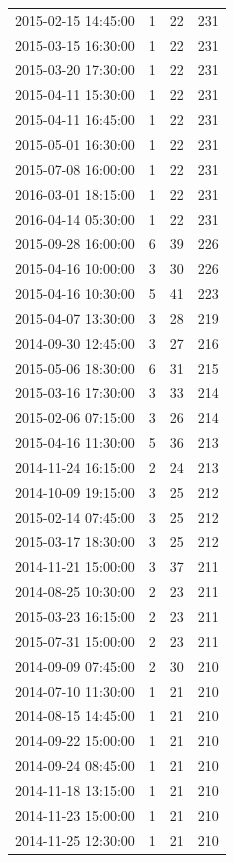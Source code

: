 \begin{tabular}{lrrr}
2015-02-15 14:45:00 & 1 & 22 & 231 \\
2015-03-15 16:30:00 & 1 & 22 & 231 \\
2015-03-20 17:30:00 & 1 & 22 & 231 \\
2015-04-11 15:30:00 & 1 & 22 & 231 \\
2015-04-11 16:45:00 & 1 & 22 & 231 \\
2015-05-01 16:30:00 & 1 & 22 & 231 \\
2015-07-08 16:00:00 & 1 & 22 & 231 \\
2016-03-01 18:15:00 & 1 & 22 & 231 \\
2016-04-14 05:30:00 & 1 & 22 & 231 \\
2015-09-28 16:00:00 & 6 & 39 & 226 \\
2015-04-16 10:00:00 & 3 & 30 & 226 \\
2015-04-16 10:30:00 & 5 & 41 & 223 \\
2015-04-07 13:30:00 & 3 & 28 & 219 \\
2014-09-30 12:45:00 & 3 & 27 & 216 \\
2015-05-06 18:30:00 & 6 & 31 & 215 \\
2015-03-16 17:30:00 & 3 & 33 & 214 \\
2015-02-06 07:15:00 & 3 & 26 & 214 \\
2015-04-16 11:30:00 & 5 & 36 & 213 \\
2014-11-24 16:15:00 & 2 & 24 & 213 \\
2014-10-09 19:15:00 & 3 & 25 & 212 \\
2015-02-14 07:45:00 & 3 & 25 & 212 \\
2015-03-17 18:30:00 & 3 & 25 & 212 \\
2014-11-21 15:00:00 & 3 & 37 & 211 \\
2014-08-25 10:30:00 & 2 & 23 & 211 \\
2015-03-23 16:15:00 & 2 & 23 & 211 \\
2015-07-31 15:00:00 & 2 & 23 & 211 \\
2014-09-09 07:45:00 & 2 & 30 & 210 \\
2014-07-10 11:30:00 & 1 & 21 & 210 \\
2014-08-15 14:45:00 & 1 & 21 & 210 \\
2014-09-22 15:00:00 & 1 & 21 & 210 \\
2014-09-24 08:45:00 & 1 & 21 & 210 \\
2014-11-18 13:15:00 & 1 & 21 & 210 \\
2014-11-23 15:00:00 & 1 & 21 & 210 \\
2014-11-25 12:30:00 & 1 & 21 & 210 \\

\end{tabular}

